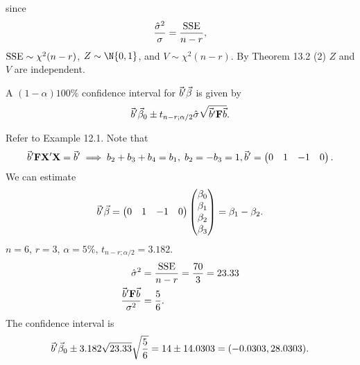 since
\[ \frac{\hat{\sigma}^2}{\sigma}=\frac{\text{SSE}}{n-r}, \]
$ \text{SSE} \sim \chi^2(n-r) $, $ Z \sim \N{0,1} $, and $ V \sim \chi^2(n-r) $.
By Theorem 13.2 (2) $ Z $ and $ V $ are independent.

A $ (1-\alpha)100\% $ confidence interval for $ \vec{b}'\vec{\beta} $
is given by
\[ \vec{b}'\vec{\beta}_0\pm t_{n-r;\alpha/2}\hat{\sigma}\sqrt{\vec{b}'\mathbf{F}\vec{b}}. \]
\begin{Example}{}{}
    Refer to Example 12.1. Note that
    \[ \vec{b}'\mathbf{F}\mathbf{X}'\mathbf{X}=\vec{b}'\implies
        b_2+b_3+b_4=b_1,\; b_2=-b_3=1,
        \vec{b}'=\begin{pmatrix}
            0 & 1 & -1 & 0
        \end{pmatrix}. \]
    We can estimate
    \[ \vec{b}'\vec{\beta}=\begin{pmatrix}
            0 & 1 & -1 & 0
        \end{pmatrix}\begin{pmatrix}
            \beta_0 \\
            \beta_1 \\
            \beta_2 \\
            \beta_3
        \end{pmatrix}=\beta_1-\beta_2. \]
    $ n=6 $, $ r=3 $, $ \alpha=5\% $, $ t_{n-r;\alpha/2}=3.182 $.
    \begin{align*}
        \hat{\sigma}^2                                   & =\frac{\text{SSE}}{n-r}=\frac{70}{3}=23.33 \\
        \frac{\vec{b}'\mathbf{F}\vec{b}}{\sigma^2} & =\frac{5}{6}.
    \end{align*}
    The confidence interval is
    \[ \vec{b}'\vec{\beta}_0\pm 3.182\sqrt{23.33}\sqrt{\frac{5}{6}}
        =14\pm 14.0303=(-0.0303,28.0303). \]
\end{Example}